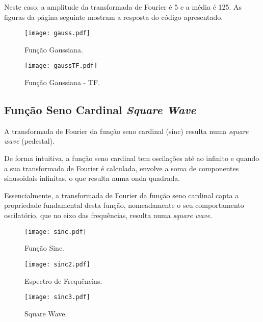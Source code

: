 Neste caso, a amplitude da transformada de Fourier é 5 e a média é 125. As figuras da página seguinte mostram a resposta do código apresentado.

\newpage

\begin{figure}[!ht]
    \centering
    \begin{minipage}[b]{0.49\textwidth}
        \centering
        \texttt{[image: gauss.pdf]}
        \caption{Função Gaussiana.}
    \end{minipage}
    \hfill
    \begin{minipage}[b]{0.49\textwidth}
        \centering
        \texttt{[image: gaussTF.pdf]}
        \caption{Função Gaussiana - TF.}
    \end{minipage}
\end{figure}

\subsection{Função Seno Cardinal \boldmath{$\rightarrow$} \emph{Square Wave}}



A transformada de Fourier da função seno cardinal (sinc) resulta numa \emph{square wave} (pedestal). 

De forma intuitiva, a função seno cardinal tem oscilações até ao infinito e quando a sua transformada de Fourier é calculada, envolve a soma de componentes sinusoidais infinitas, o que resulta numa onda quadrada. 

Essencialmente, a transformada de Fourier da função seno cardinal capta a propriedade fundamental desta função, nomeadamente o seu comportamento oscilatório, que no eixo das frequências, resulta numa \emph{square wave}.

\begin{figure}[!ht]
\centering
\texttt{[image: sinc.pdf]}
\caption{Função Sinc.}
\end{figure}

\begin{figure}[!ht]
    \centering
    \begin{minipage}[b]{0.49\textwidth}
        \centering
        \texttt{[image: sinc2.pdf]}
        \caption{Espectro de Frequências.}
    \end{minipage}
    \hfill
    \begin{minipage}[b]{0.49\textwidth}
        \centering
        \texttt{[image: sinc3.pdf]}
        \caption{Square Wave.}
    \end{minipage}
\end{figure}

